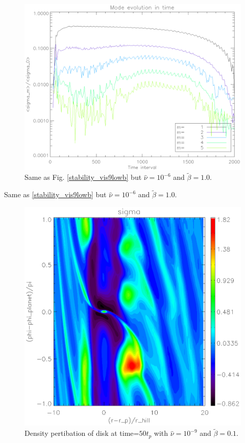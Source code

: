 \begin{figure}
   \includegraphics[scale=.42]{figures/stability_vis6betamed.ps}
   \caption{Same as Fig. \ref{stability_vis9lowb} but $\hat{\nu}=10^{-6}$ and $\tilde{\beta}=1.0$. }
 \label{stability_vis6medb)}
 \end{figure}
Same as \ref{stability_vis9lowb} but $\hat{\nu}=10^{-6}$ and $\tilde{\beta}=1.0$. 
\begin{figure}
   \includegraphics[scale=.60]{figures/analysis_sigma50lowb.ps}
   \caption{Density pertibation of disk at time=$50t_p$ with $\hat{\nu}=10^{-9}$ and $\tilde{\beta}=0.1$. }
 \label{shortterm_lowb)}
 \end{figure}

